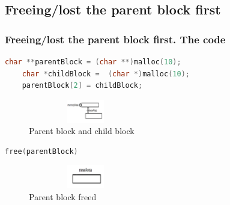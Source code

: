 \documentclass[10pt,xcolor={usenames,dvipsnames}]{beamer}
\begin{document}
\subsection{Freeing/lost the parent block first}

\begin{frame}[fragile]
\frametitle{Freeing/lost the parent block first. The code} 
	\begin{center}
		\begin{lstlisting}[language=C++]
	char **parentBlock = (char **)malloc(10);
	char *childBlock =  (char *)malloc(10);
	parentBlock[2] = childBlock;
		\end{lstlisting}

		\begin{figure}
			\caption{Parent block and child block}
			\includegraphics[height=1cm,width=5cm]{freeing-parent-block-first.png}
		\end{figure}

		\begin{lstlisting}[language=C++]
		free(parentBlock)
		\end{lstlisting}
		\begin{figure}
			\caption{Parent block freed}
			\includegraphics[height=1cm,width=5cm]{freeing-parent-block-first2.png}
		\end{figure}
	\end{center}
\end{frame}
\end{document}
